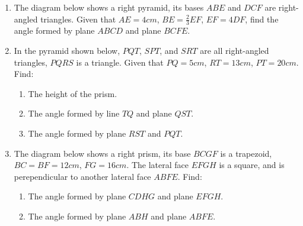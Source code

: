 \documentclass{report}
\begin{document}
\begin{multicols}{2}
\begin{enumerate}
\begin{center}
              \end{center}
        \item The diagram below shows a right pyramid, its bases $ABE$ and $DCF$ are
              right-angled triangles. Given that $AE = 4cm$, $BE = \frac{2}{3}EF$, $EF =
                  4DF$, find the angle formed by plane $ABCD$ and plane $BCFE$.
        \item In the pyramid shown below, $PQT$, $SPT$, and $SRT$ are all right-angled
              triangles, $PQRS$ is a triangle. Given that $PQ = 5cm$, $RT = 13cm$, $PT =
                  20cm$. Find:
              \begin{enumerate}
                  \item The height of the prism.
                  \item The angle formed by line $TQ$ and plane $QST$.
                  \item The angle formed by plane $RST$ and $PQT$.
              \end{enumerate}
        \item The diagram below shows a right prism, its base $BCGF$ is a trapezoid, $BC = BF
                  = 12cm$, $FG = 16cm$. The lateral face $EFGH$ is a square, and is
              perependicular to another lateral face $ABFE$. Find:
              \begin{enumerate}
                  \item The angle formed by plane $CDHG$ and plane $EFGH$.
                  \item The angle formed by plane $ABH$ and plane $ABFE$.
              \end{enumerate}
              \begin{center}
\end{center}
\end{enumerate}
\end{multicols}
\end{document}
